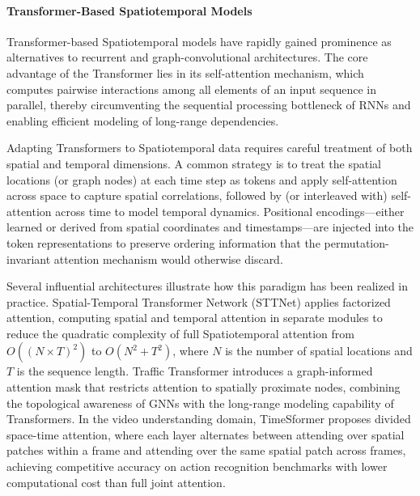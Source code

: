 \documentclass[acmsmall]{acmart}
\begin{document}
\paragraph{Transformer-Based Spatiotemporal Models}
Transformer-based Spatiotemporal models have rapidly gained prominence as alternatives to recurrent and graph-convolutional architectures. The core advantage of the Transformer \cite{vaswani2017attention} lies in its self-attention mechanism, which computes pairwise interactions among all elements of an input sequence in parallel, thereby circumventing the sequential processing bottleneck of RNNs and enabling efficient modeling of long-range dependencies.
 
Adapting Transformers to Spatiotemporal data requires careful treatment of both spatial and temporal dimensions. A common strategy is to treat the spatial locations (or graph nodes) at each time step as tokens and apply self-attention across space to capture spatial correlations, followed by (or interleaved with) self-attention across time to model temporal dynamics. Positional encodings—either learned or derived from spatial coordinates and timestamps—are injected into the token representations to preserve ordering information that the permutation-invariant attention mechanism would otherwise discard.
 
Several influential architectures illustrate how this paradigm has been realized in practice. Spatial-Temporal Transformer Network (STTNet) applies factorized attention, computing spatial and temporal attention in separate modules to reduce the quadratic complexity of full Spatiotemporal attention from $O((N \times T)^2)$ to $O(N^2 + T^2)$, where $N$ is the number of spatial locations and $T$ is the sequence length. Traffic Transformer \cite{cai2020traffic} introduces a graph-informed attention mask that restricts attention to spatially proximate nodes, combining the topological awareness of GNNs with the long-range modeling capability of Transformers. In the video understanding domain, TimeSformer \cite{bertasius2021timesformer} proposes divided space-time attention, where each layer alternates between attending over spatial patches within a frame and attending over the same spatial patch across frames, achieving competitive accuracy on action recognition benchmarks with lower computational cost than full joint attention.
 
\end{document}
